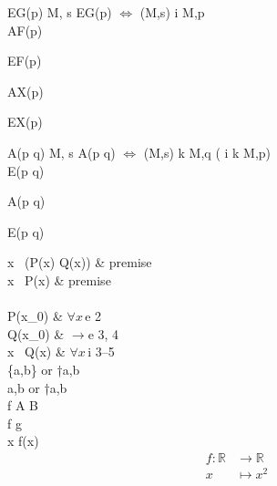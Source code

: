 EG(p)
M, s \models EG(p) $\Leftrightarrow$     \exists \pi \in  \sqcap (M,s) \cdot \forall i \cdot M,\pi[i] \models p\\

AF(p)

EF(p)

AX(p)

EX(p)

A(p \cup q)
M, s \models  A(p \cup q)   $\Leftrightarrow$     \forall \pi \in  \sqcap (M,s) \cdot \exists k \cdot M,\pi[k] \models q \wedge ( \forall i \leq k \cdot M,\pi [i] \models p)\\
E(p \cup q)

A(p \Re q)

E(p \Re q)

\forall x \, (P(x) \to Q(x)) & premise \\
\forall x \, P(x) & premise \\\hspace*{-30pt} \\


P(x_0) & $\forall x \, \mathrm{e}$ 2 \\
Q(x_0) & $\to \mathrm{e}$ 3, 4 \\

\forall x \, Q(x) & $\forall x \, \mathrm{i}$ 3--5 \\







\{a,b\} or \set†{a,b} \\
\langle a,b \rangle or \gens†{a,b} \\


f \colon A \to B \\

f \circ g \\
x \mapsto f(x) \\

\begin{align*}
	f \colon \mathbb{R} &\to \mathbb{R} \\
	x &\mapsto x^2
\end{align*}


